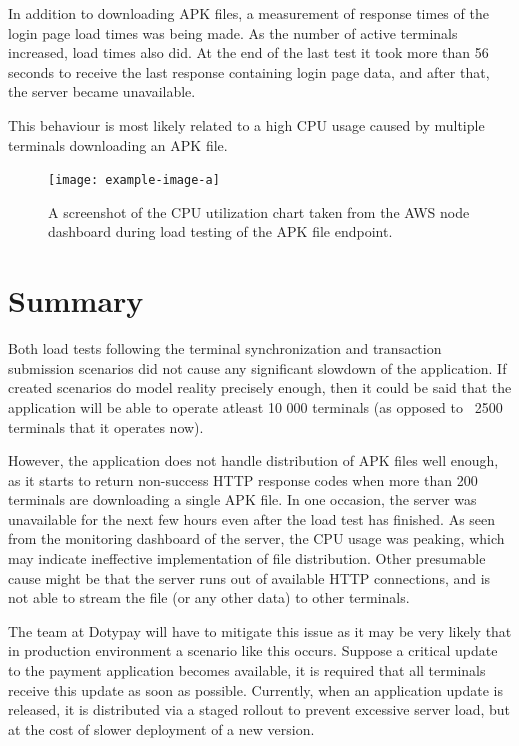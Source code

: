 \documentclass[12pt, a4paper]{article}
\let\oldsection\section
\renewcommand\section{\clearpage\oldsection}
\begin{document}
In addition to downloading APK files, a measurement of response times of the login page load times was being made.
As the number of active terminals increased, load times also did.
At the end of the last test it took more than 56 seconds to receive the last response containing login page data, and after that, the server became unavailable.

This behaviour is most likely related to a high CPU usage caused by multiple terminals downloading an APK file.

\begin{figure}[!ht]
    \centering 
    \texttt{[image: example-image-a]}
    \caption{A screenshot of the CPU utilization chart taken from the AWS node dashboard during load testing of the APK file endpoint.}
    \label{fig:cpu-usage-2}
\end{figure}

\section{Summary}
Both load tests following the terminal synchronization and transaction submission scenarios did not cause any significant slowdown of the application.
If created scenarios do model reality precisely enough, then it could be said that the application will be able to operate atleast 10 000 terminals (as opposed to ~2500 terminals that it operates now).

However, the application does not handle distribution of APK files well enough, as it starts to return non-success HTTP response codes when more than 200 terminals are downloading a single APK file.
In one occasion, the server was unavailable for the next few hours even after the load test has finished.
As seen from the monitoring dashboard of the server, the CPU usage was peaking, which may indicate ineffective implementation of file distribution.
Other presumable cause might be that the server runs out of available HTTP connections, and is not able to stream the file (or any other data) to other terminals.

The team at Dotypay will have to mitigate this issue as it may be very likely that in production environment a scenario like this occurs.
Suppose a critical update to the payment application becomes available, it is required that all terminals receive this update as soon as possible.
Currently, when an application update is released, it is distributed via a staged rollout to prevent excessive server load, but at the cost of slower deployment of a new version.
\end{document}
